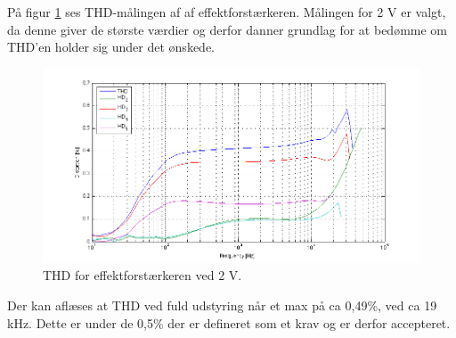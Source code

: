 På figur \ref{fig:acceff:thd2v} ses THD-målingen af af effektforstærkeren. Målingen for 2 V er valgt, da denne giver de største værdier og derfor danner grundlag for at bedømme om THD'en holder sig under det ønskede.
\begin{figure}[h]
\centering
\includegraphics[width=\textwidth]{maalerapporter/effektforstaerker/2V-45mA-uden-modstand-thd.png}
\caption{THD for effektforstærkeren ved 2 V.}
\label{fig:acceff:thd2v}
\end{figure}

Der kan aflæses at THD ved fuld udstyring når et max på ca 0,49\%, ved ca 19 kHz. Dette er under de 0,5\% der er defineret som et krav og er derfor accepteret. 